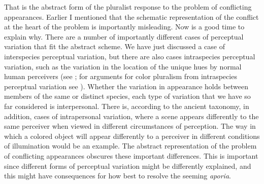 \documentclass[12pt]{article}
\begin{document}
That is the abstract form of the pluralist response to the problem of conflicting appearances. Earlier I mentioned that the schematic representation of the conflict at the heart of the problem is importantly misleading. Now is a good time to explain why. There are a number of importantly different cases of perceptual variation that fit the abstract scheme. We have just discussed a case of interspecies perceptual variation, but there are also cases intraspecies perceptual variation, such as the variation in the location of the unique hues by normal human perceivers (see \citealt{Leon-M.-Hurvich:1968fu,Hardin:1993kn,Tye:2006lr,Cohen:2006fj,Tye:2006yq,Byrne:2007qy,Cohen:2007kx,Tye:2007fk,Kalderon:2006tg}; for arguments for color pluralism from intraspecies perceptual variation see \citealt{Byrne:1997dk,tye00,Mizrahi:2006zr,Kalderon:2006tg}). Whether the variation in appearance holds between members of the same or distinct species, each type of variation that we have so far considered is interpersonal. There is, according to the ancient taxonomy, in addition, cases of intrapersonal variation, where a scene appears differently to the same perceiver when viewed in different circumstances of perception. The way in which a colored object will appear differently to a perceiver in different conditions of illumination would be an example. The abstract representation of the problem of conflicting appearances obscures these important differences. This is important since different forms of perceptual variation might be differently explained, and this might have consequences for how best to resolve the seeming \emph{aporia}. 
\end{document}
